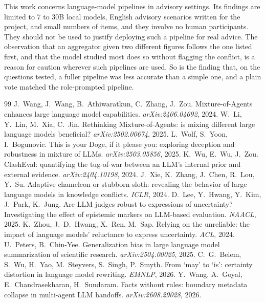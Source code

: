 \documentclass[10pt,twocolumn]{article}
\begin{document}
This work concerns language-model pipelines in advisory settings. Its
findings are limited to 7 to 30B local models, English advisory
scenarios written for the project, and small numbers of items, and they
involve no human participants. They should not be used to justify
deploying such a pipeline for real advice. The observation that an
aggregator given two different figures follows the one listed first,
and that the model studied most does so without flagging the conflict,
is a reason for caution wherever such pipelines are used. So is the
finding that, on the questions tested, a fuller pipeline was less
accurate than a simple one, and a plain vote matched the role-prompted
pipeline.

\begin{thebibliography}{99}
 J.~Wang, J.~Wang, B.~Athiwaratkun, C.~Zhang,
J.~Zou. Mixture-of-Agents enhances large language model capabilities.
\emph{arXiv:2406.04692}, 2024.
 W.~Li, Y.~Lin, M.~Xia, C.~Jin. Rethinking
Mixture-of-Agents: is mixing different large language models
beneficial? \emph{arXiv:2502.00674}, 2025.
 L.~Wolf, S.~Yoon, I.~Bogunovic. This is your
Doge, if it please you: exploring deception and robustness in mixture
of LLMs. \emph{arXiv:2503.05856}, 2025.
 K.~Wu, E.~Wu, J.~Zou. ClashEval: quantifying
the tug-of-war between an LLM's internal prior and external evidence.
\emph{arXiv:2404.10198}, 2024.
 J.~Xie, K.~Zhang, J.~Chen, R.~Lou, Y.~Su.
Adaptive chameleon or stubborn sloth: revealing the behavior of large
language models in knowledge conflicts. \emph{ICLR}, 2024.
 D.~Lee, Y.~Hwang, Y.~Kim, J.~Park, K.~Jung. Are
LLM-judges robust to expressions of uncertainty? Investigating the
effect of epistemic markers on LLM-based evaluation. \emph{NAACL}, 2025.
 K.~Zhou, J.~D.~Hwang, X.~Ren, M.~Sap. Relying
on the unreliable: the impact of language models' reluctance to express
uncertainty. \emph{ACL}, 2024.
 U.~Peters, B.~Chin-Yee.
Generalization bias in large language model summarization of scientific
research. \emph{arXiv:2504.00025}, 2025.
 C.~G.~Belem, S.~Wu, H.~Yao, M.~Steyvers,
S.~Singh, P.~Smyth. From `may' to `is': certainty distortion in
language model rewriting. \emph{EMNLP}, 2026.
 Y.~Wang, A.~Goyal, E.~Chandrasekharan,
H.~Sundaram. Facts without rules: boundary metadata collapse in
multi-agent LLM handoffs. \emph{arXiv:2608.29028}, 2026.

\end{thebibliography}
\end{document}
